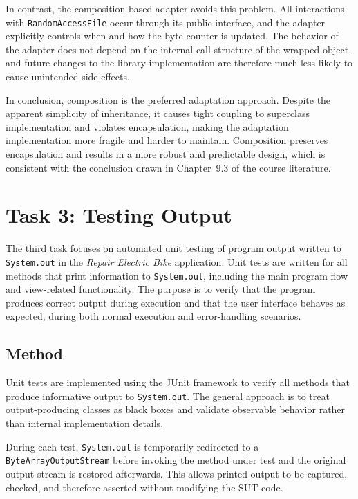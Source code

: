 \documentclass[a4paper]{scrartcl}
\begin{document}
In contrast, the composition-based adapter avoids this problem. All interactions with \texttt{RandomAccessFile} occur through its public interface, and the adapter explicitly controls when and how the byte counter is updated. The behavior of the adapter does not depend on the internal call structure of the wrapped object, and future changes to the library implementation are therefore much less likely to cause unintended side effects.

In conclusion, composition is the preferred adaptation approach. Despite the apparent simplicity of inheritance, it causes tight coupling to superclass implementation and violates encapsulation, making the adaptation implementation more fragile and harder to maintain. Composition preserves encapsulation and results in a more robust and predictable design, which is consistent with the conclusion drawn in Chapter~9.3 of the course literature.

\section{Task 3: Testing Output}
The third task focuses on automated unit testing of program output written to \texttt{System.out} in the \textit{Repair Electric Bike} application. Unit tests are written for all methods that print information to \texttt{System.out}, including the main program flow and view-related functionality. The purpose is to verify that the program produces correct output during execution and that the user interface behaves as expected, during both normal execution and error-handling scenarios. 

\subsection{Method}

Unit tests are implemented using the JUnit framework to verify all methods that produce informative output to \texttt{System.out}. The general approach is to treat output-producing classes as black boxes and validate observable behavior rather than internal implementation details.

During each test, \texttt{System.out} is temporarily redirected to a \texttt{ByteArrayOutputStream} before invoking the method under test and the original output stream is restored afterwards. This allows printed output to be captured, checked, and therefore asserted without modifying the SUT code.
\end{document}
